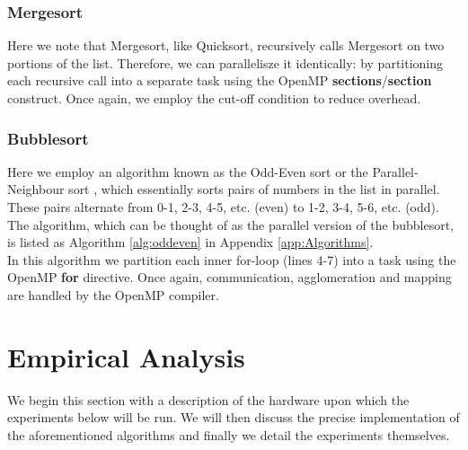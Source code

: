 \documentclass[10pt]{article}
\begin{document}
\subsubsection{Mergesort}
Here we note that Mergesort, like Quicksort, recursively calls Mergesort on two portions of the list. Therefore, we can parallelisze it identically: by partitioning each recursive call into a separate task using the OpenMP \textbf{sections}/\textbf{section} construct. Once again, we employ the cut-off condition to reduce overhead.
\subsubsection{Bubblesort}
Here we employ an algorithm known as the Odd-Even sort or the Parallel-Neighbour sort \cite{habermann72}, which essentially sorts pairs of numbers in the list in parallel. These pairs alternate from 0-1, 2-3, 4-5, etc. (even) to 1-2, 3-4, 5-6, etc. (odd). The algorithm, which can be thought of as the parallel version of the bubblesort, is listed as Algorithm \ref{alg:oddeven} in Appendix \ref{app:Algorithms}.
\\
In this algorithm we partition each inner for-loop (lines 4-7) into a task using the OpenMP \textbf{for} directive. Once again, communication, agglomeration and mapping are handled by the OpenMP compiler.
\section{Empirical Analysis}
We begin this section with a description of the hardware upon which the experiments below will be run. We will then discuss the precise implementation of the aforementioned algorithms and finally we detail the experiments themselves.
\end{document}
